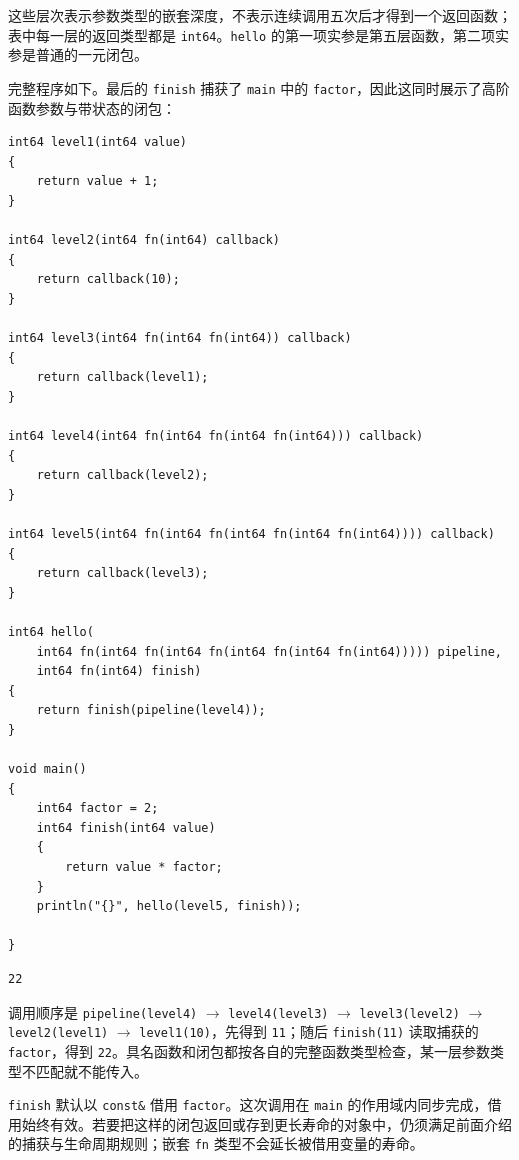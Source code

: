 这些层次表示参数类型的嵌套深度，不表示连续调用五次后才得到一个返回函数；表中每一层的返回类型都是 \texttt{int64}。\texttt{hello} 的第一项实参是第五层函数，第二项实参是普通的一元闭包。

完整程序如下。最后的 \texttt{finish} 捕获了 \texttt{main} 中的 \texttt{factor}，因此这同时展示了高阶函数参数与带状态的闭包：

\par
\medskip
\begin{lstlisting}[style=chali]
int64 level1(int64 value)
{
    return value + 1;
}

int64 level2(int64 fn(int64) callback)
{
    return callback(10);
}

int64 level3(int64 fn(int64 fn(int64)) callback)
{
    return callback(level1);
}

int64 level4(int64 fn(int64 fn(int64 fn(int64))) callback)
{
    return callback(level2);
}

int64 level5(int64 fn(int64 fn(int64 fn(int64 fn(int64)))) callback)
{
    return callback(level3);
}

int64 hello(
    int64 fn(int64 fn(int64 fn(int64 fn(int64 fn(int64))))) pipeline,
    int64 fn(int64) finish)
{
    return finish(pipeline(level4));
}

void main()
{
    int64 factor = 2;
    int64 finish(int64 value)
    {
        return value * factor;
    }
    println("{}", hello(level5, finish));

}
\end{lstlisting}
\par
\medskip

\par
\medskip
\begin{lstlisting}[style=out]
22
\end{lstlisting}
\par
\medskip

调用顺序是 \texttt{pipeline(\allowbreak{}level4)\allowbreak{}} \ensuremath{\rightarrow} \texttt{level4(\allowbreak{}level3)\allowbreak{}} \ensuremath{\rightarrow} \texttt{level3(\allowbreak{}level2)\allowbreak{}} \ensuremath{\rightarrow} \texttt{level2(\allowbreak{}level1)\allowbreak{}} \ensuremath{\rightarrow} \texttt{level1(\allowbreak{}10)\allowbreak{}}，先得到 \texttt{11}；随后 \texttt{finish(\allowbreak{}11)\allowbreak{}} 读取捕获的 \texttt{factor}，得到 \texttt{22}。具名函数和闭包都按各自的完整函数类型检查，某一层参数类型不匹配就不能传入。

\texttt{finish} 默认以 \texttt{const\&} 借用 \texttt{factor}。这次调用在 \texttt{main} 的作用域内同步完成，借用始终有效。若要把这样的闭包返回或存到更长寿命的对象中，仍须满足前面介绍的捕获与生命周期规则；嵌套 \texttt{fn} 类型不会延长被借用变量的寿命。

